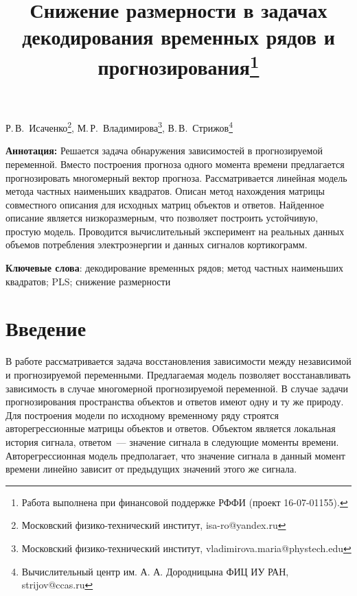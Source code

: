 \documentclass[12pt,twoside]{article}
\begin{document}
	\title
	{Снижение размерности в задачах декодирования временных рядов и прогнозирования\thanks{Работа выполнена при финансовой поддержке РФФИ (проект 16-07-01155).}}
	\date{}
	\maketitle
	\begin{center}
		Р.\,В.~Исаченко\footnote{Московский физико-технический институт, isa-ro@yandex.ru},
		М.\,Р.~Владимирова\footnote{Московский физико-технический институт, vladimirova.maria@phystech.edu},
		В.\,В.~Стрижов\footnote{Вычислительный центр им. А. А. Дородницына ФИЦ ИУ РАН, strijov@ccas.ru}
	\end{center}
	\textbf{Аннотация:} Решается задача обнаружения зависимостей в прогнозируемой переменной. 
	Вместо построения прогноза одного момента времени предлагается прогнозировать многомерный вектор прогноза.
	Рассматривается линейная модель метода частных наименьших квадратов. 
	Описан метод нахождения матрицы совместного описания для исходных матриц объектов и ответов. 
	Найденное описание является низкоразмерным, что позволяет построить устойчивую, простую модель.
	Проводится вычислительный эксперимент на реальных данных объемов потребления электроэнергии и данных сигналов кортикограмм.
	
	\bigskip
	\textbf{Ключевые слова}: декодирование временных рядов; метод частных наименьших квадратов; PLS; снижение размерности

\linenumbers
\section{Введение}

В работе рассматривается задача восстановления зависимости между независимой и прогнозируемой переменными.
Предлагаемая модель позволяет восстанавливать зависимость в случае многомерной прогнозируемой переменной. 
В случае задачи прогнозирования пространства объектов и ответов имеют одну и ту же природу.
Для построения модели по исходному временному ряду строятся авторегрессионные матрицы объектов и ответов. 
Объектом является локальная история сигнала, ответом~--- значение сигнала в следующие моменты времени.
Авторегрессионная модель предполагает, что значение сигнала в данный момент времени линейно зависит от предыдущих значений этого же сигнала.   
\end{document}
